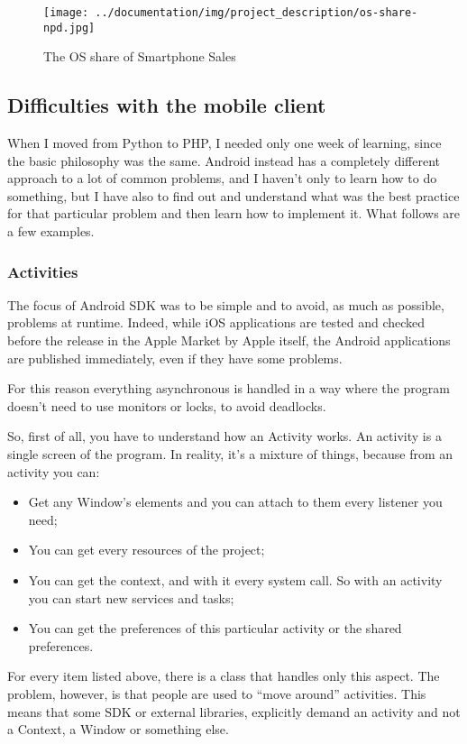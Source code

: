 \begin{figure}[H]
\centering %
\texttt{[image: ../documentation/img/project\_description/os-share-npd.jpg]}
\caption{The OS share of Smartphone Sales}
\label{fig:osShare}
\end{figure}

\subsection{Difficulties with the mobile client}
When I moved from Python to PHP, I needed only one week of learning, since the basic philosophy was the same. Android instead has a completely different approach to a lot of common problems, and I haven't only to learn how to do something, but I have also to find out and understand what was the best practice for that particular problem and then learn how to implement it. What follows are a few examples.

\subsubsection{Activities}
The focus of Android SDK was to be simple and to avoid, as much as possible, problems at runtime. Indeed, while iOS applications are tested and checked before the release in the Apple Market by Apple itself, the Android applications are published immediately, even if they have some problems.

For this reason everything asynchronous is handled in a way where the program doesn't need to use monitors or locks, to avoid deadlocks.

So, first of all, you have to understand how an Activity works. An activity is a single screen of the program. In reality, it's a mixture of things, because from an activity you can:
\begin{itemize}
	\item Get any Window's elements and you can attach to them every listener you need;
	\item You can get every resources of the project;
	\item You can get the context, and with it every system call. So with an activity you can start new services and tasks;
	\item You can get the preferences of this particular activity or the shared preferences.
\end{itemize}

For every item listed above, there is a class that handles only this aspect. The problem, however, is that people are used to ``move around'' activities. This means that some SDK or external libraries, explicitly demand an activity and not a Context, a Window or something else.

